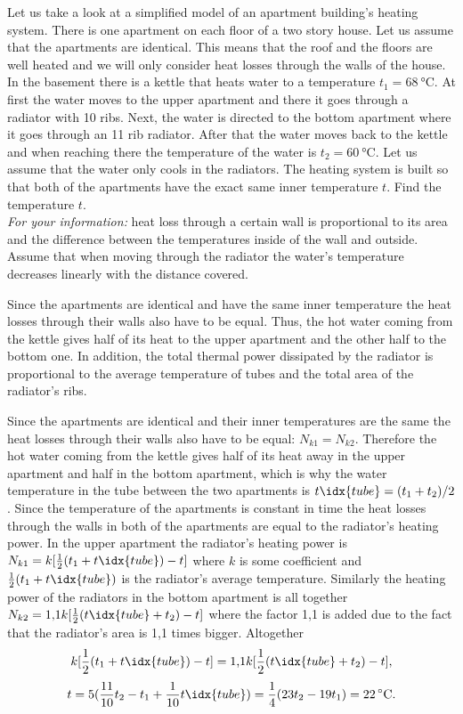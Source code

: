 Let us take a look at a simplified model of an apartment building’s heating system. There is one apartment on each floor of a two story house. Let us assume that the apartments are identical. This means that the roof and the floors are well heated and we will only consider heat losses through the walls of the house.\\
In the basement there is a kettle that heats water to a temperature $t_1=\SI{68}{\degreeCelsius}$. At first the water moves to the upper apartment and there it goes through a radiator with 10 ribs. Next, the water is directed to the bottom apartment where it goes through an 11 rib radiator. After that the water moves back to the kettle and when reaching there the temperature of the water is $t_2=\SI{60}{\degreeCelsius}$. Let us assume that the water only cools in the radiators. The heating system is built so that both of the apartments have the exact same inner temperature $t$. Find the temperature $t$. \\
\emph{For your information:} heat loss through a certain wall is proportional to its area and the difference between the temperatures inside of the wall and outside. Assume that when moving through the radiator the water’s temperature decreases linearly with the distance covered.

\hinteng
Since the apartments are identical and have the same inner temperature the heat losses through their walls also have to be equal. Thus, the hot water coming from the kettle gives half of its heat to the upper apartment and the other half to the bottom one. In addition, the total thermal power dissipated by the radiator is proportional to the average temperature of tubes and the total area of the radiator’s ribs.

\solueng
Since the apartments are identical and their inner temperatures are the same the heat losses through their walls also have to be equal: $N_{k1}=N_{k2}$. Therefore the hot water coming from the kettle gives half of its heat away in the upper apartment and half in the bottom apartment, which is why the water temperature in the tube between the two apartments is $t\idx{tube}=(t_1+t_2)/2$. Since the temperature of the apartments is constant in time the heat losses through the walls in both of the apartments are equal to the radiator’s heating power. In the upper apartment the radiator’s heating power is $N_{k1}=k[\frac{1}{2}(t_1+t\idx{tube})-t]$ where $k$ is some coefficient and $\frac{1}{2}(t_1+t\idx{tube})$ is the radiator’s average temperature. Similarly the heating power of the radiators in the bottom apartment is all together $N_{k2}=\text{1,1} k[\frac{1}{2}(t\idx{tube}+t_{2})-t]$ where the factor 1,1 is added due to the fact that the radiator’s area is 1,1 times bigger. Altogether
\[ k[\frac{1}{2}(t_1+t\idx{tube})-t]=\text{1,1}k[\frac{1}{2}(t\idx{tube}+t_{2})-t], \]
\[ t=5 (\frac{11}{10}t_2-t_1+\frac{1}{10}t\idx{tube})=\frac{1}{4}(23t_2-19t_1)=22\,^{\circ}\mathrm{C}. \]
\probend